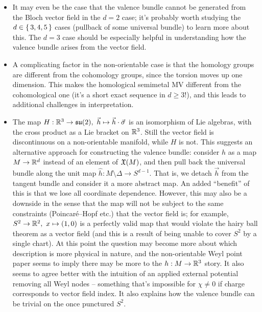 {\begin{itemize}
	\item It may even be the case that the valence bundle cannot be generated from the Bloch vector field in the $d=2$ case; it's probably worth studying the $d\in\set{3,4,5}$ cases (pullback of some universal bundle) to learn more about this. The $d=3$ case should be especially helpful in understanding how the valence bundle arises from the vector field.
	
	\item A complicating factor in the non-orientable case is that the homology groups are different from the cohomology groups, since the torsion moves up one dimension. This makes the homological semimetal MV different from the cohomological one (it's a short exact sequence in $d\geq3$!), and this leads to additional challenges in interpretation.
	
	\item The map $H: \R^3\to\la[su](2),\ \vec{h}\mapsto \vec{h}\cdot\vec{\sigma}$ is an isomorphism of Lie algebras, with the cross product as a Lie bracket on $\mathbb{R}^3$. Still the vector field is discontinuous on a non-orientable manifold, while $H$ is not. This suggests an alternative approach for constructing the valence bundle: consider $h$ as a map $M\to\mathbb{R}^d$ instead of an element of $\mathfrak{X}(M)$, and then pull back the universal bundle along the unit map $\hat{h}:M\setminus\Delta\to S^{d-1}$. That is, we detach $\vec{h}$ from the tangent bundle and consider it a more abstract map. An added ``benefit'' of this is that we lose all coordinate dependence. However, this may also be a downside in the sense that the map will not be subject to the same constraints (Poincaré--Hopf etc.) that the vector field is; for example, $S^2\to\R^2,\ x\mapsto(1,0)$ is a perfectly valid map that would violate the hairy ball theorem as a vector field (and this is a result of being unable to cover $S^2$ by a single chart). At this point the question may become more about which description is more physical in nature, and the non-orientable Weyl point paper\cite{Fonseca-Vaidya_nonorientable} seems to imply there may be more to the $h:M\to\mathbb{R}^3$ story. It also seems to agree better with the intuition of an applied external potential removing all Weyl nodes -- something that's impossible for $\chi\neq0$ if charge corresponds to vector field index. It also explains how the valence bundle can be trivial on the once punctured $S^2$.
	

\end{itemize}}
